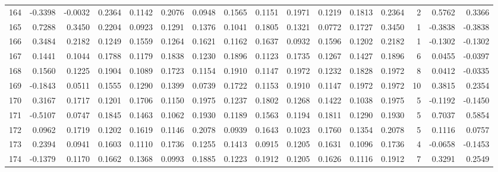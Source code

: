 \begin{tabular}{lrrrrrrrrrrrrrrr}
164 &     -0.3398 & -0.0032 &  0.2364 &  0.1142 &  0.2076 &  0.0948 &  0.1565 &  0.1151 &  0.1971 &  0.1219 &   0.1813 &     0.2364 &      2 &                    0.5762 &                     0.3366 \\
165 &      0.7288 &  0.3450 &  0.2204 &  0.0923 &  0.1291 &  0.1376 &  0.1041 &  0.1805 &  0.1321 &  0.0772 &   0.1727 &     0.3450 &      1 &                   -0.3838 &                    -0.3838 \\
166 &      0.3484 &  0.2182 &  0.1249 &  0.1559 &  0.1264 &  0.1621 &  0.1162 &  0.1637 &  0.0932 &  0.1596 &   0.1202 &     0.2182 &      1 &                   -0.1302 &                    -0.1302 \\
167 &      0.1441 &  0.1044 &  0.1788 &  0.1179 &  0.1838 &  0.1230 &  0.1896 &  0.1123 &  0.1735 &  0.1267 &   0.1427 &     0.1896 &      6 &                    0.0455 &                    -0.0397 \\
168 &      0.1560 &  0.1225 &  0.1904 &  0.1089 &  0.1723 &  0.1154 &  0.1910 &  0.1147 &  0.1972 &  0.1232 &   0.1828 &     0.1972 &      8 &                    0.0412 &                    -0.0335 \\
169 &     -0.1843 &  0.0511 &  0.1555 &  0.1290 &  0.1399 &  0.0739 &  0.1722 &  0.1153 &  0.1910 &  0.1147 &   0.1972 &     0.1972 &     10 &                    0.3815 &                     0.2354 \\
170 &      0.3167 &  0.1717 &  0.1201 &  0.1706 &  0.1150 &  0.1975 &  0.1237 &  0.1802 &  0.1268 &  0.1422 &   0.1038 &     0.1975 &      5 &                   -0.1192 &                    -0.1450 \\
171 &     -0.5107 &  0.0747 &  0.1845 &  0.1463 &  0.1062 &  0.1930 &  0.1189 &  0.1563 &  0.1194 &  0.1811 &   0.1290 &     0.1930 &      5 &                    0.7037 &                     0.5854 \\
172 &      0.0962 &  0.1719 &  0.1202 &  0.1619 &  0.1146 &  0.2078 &  0.0939 &  0.1643 &  0.1023 &  0.1760 &   0.1354 &     0.2078 &      5 &                    0.1116 &                     0.0757 \\
173 &      0.2394 &  0.0941 &  0.1603 &  0.1110 &  0.1736 &  0.1255 &  0.1413 &  0.0915 &  0.1205 &  0.1631 &   0.1096 &     0.1736 &      4 &                   -0.0658 &                    -0.1453 \\
174 &     -0.1379 &  0.1170 &  0.1662 &  0.1368 &  0.0993 &  0.1885 &  0.1223 &  0.1912 &  0.1205 &  0.1626 &   0.1116 &     0.1912 &      7 &                    0.3291 &                     0.2549 \\

\end{tabular}
